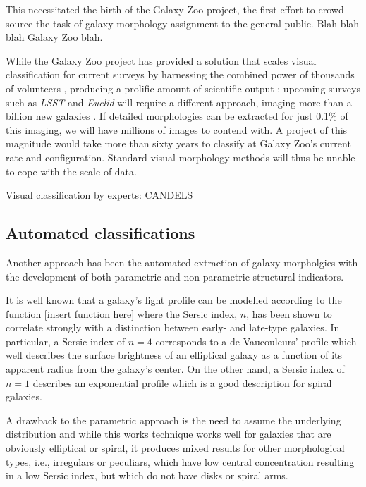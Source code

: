 This necessitated the birth of the Galaxy Zoo project, the first effort to crowd-source the task of galaxy morphology assignment to the general public. Blah blah blah Galaxy Zoo blah. 

While the Galaxy Zoo project has provided a solution that scales visual classification for current surveys  by harnessing the combined power of thousands of volunteers \citep{Lintott2008, Lintott2011, Willett2013, Willett2017, Simmons2017},  producing a prolific amount of scientific output \citep[e.g.,][]{Land2008, Bamford2009, Darg2010, Schawinski2014, Galloway2015, Smethurst2016}; upcoming surveys such as \textit{LSST} and \textit{Euclid} will require a different approach, imaging more than a billion new galaxies  \citep{LSST, Euclid}.  If detailed morphologies can be extracted for just  0.1\% of this imaging, we will have millions of images to contend with. A project of this magnitude would take more than sixty years to classify at Galaxy Zoo's current rate and configuration. Standard visual morphology 
methods will thus be unable to cope with the scale of data. 


Visual classification by experts: CANDELS \citep{Kartaltepe2015}

\subsection{Automated classifications}
Another approach has been the automated extraction of galaxy morpholgies with the development of both parametric and non-parametric structural indicators. 

It is well known that a galaxy's light profile can be modelled according to the function [insert function here] where the Sersic index, $n$, has been shown to correlate strongly with a distinction between early- and late-type galaxies. In particular, a Sersic index of $n=4$ corresponds to a de Vaucouleurs' profile which well describes the surface brightness of an elliptical galaxy as a function of its apparent radius from the galaxy's center. On the other hand, a Sersic index of $n=1$ describes an exponential profile which is a good description for spiral galaxies. 

A drawback to the parametric approach is the need to assume the underlying distribution and while this works technique works well for galaxies that are obviously elliptical or spiral, it produces mixed results for other morphological types, i.e., irregulars or peculiars, which have low central concentration resulting in a low Sersic index, but which do not have disks or spiral arms. 

